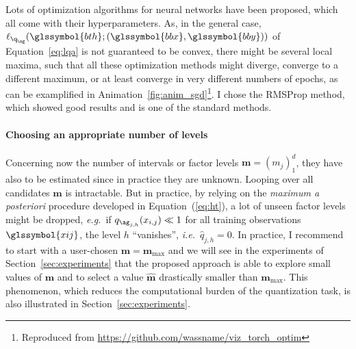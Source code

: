 Lots of optimization algorithms for neural networks have been proposed, which all come with their hyperparameters. As, in the general case, $\ell_{\q_{\ag}}(\glssymbol{bth} ; (\glssymbol{bbx},\glssymbol{bby}))$ of Equation~\eqref{eq:lqa} is not guaranteed to be convex, there might be several local maxima, such that all these optimization methods might diverge, converge to a different maximum, or at least converge in very different numbers of epochs, as can be examplified in Animation~\ref{fig:anim_sgd}\footnote{Reproduced from \url{https://github.com/wassname/viz_torch_optim}}. I chose the RMSProp method, which showed good results and is one of the standard methods.


 
\paragraph{Choosing an appropriate number of levels}

Concerning now the number of intervals or factor levels $\boldsymbol{m} = (m_j)_1^d$, they have also to be estimated since in practice they are unknown. Looping over all candidates $\boldsymbol{m}$ is intractable. But in practice, by relying on the \textit{maximum a posteriori} procedure developed in Equation~(\ref{eq:ht}), a lot of unseen factor levels might be dropped, \textit{e.g.}\ if $q_{\ag_{j,h}}(x_{i,j}) \ll 1$ for all training observations $\glssymbol{xij}$, the level $h$ ``vanishes'', \textit{i.e.}\ $\hat{q}_{j,h} = 0$. In practice, I recommend to start with a user-chosen $\bm{m}=\boldsymbol{m}_{\max}$ and we will see in the experiments of Section~\ref{sec:experiments} that the proposed approach is able to explore small values of $\boldsymbol{m}$ and to select a value $\hat{\boldsymbol{m}}$ drastically smaller than $\boldsymbol{m}_{\max}$. This phenomenon, which reduces the computational burden of the quantization task, is also illustrated in Section~\ref{sec:experiments}.

